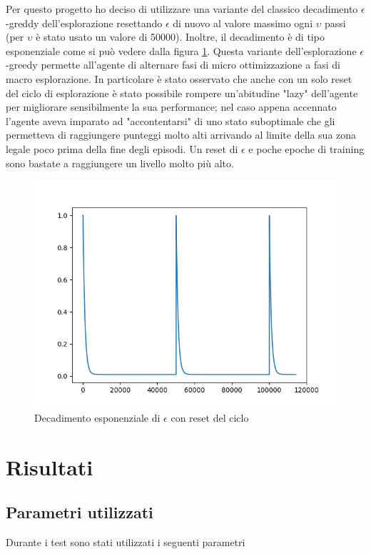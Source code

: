 \documentclass{article}
\begin{document}
		Per questo progetto ho deciso di utilizzare una variante del classico decadimento $\epsilon$-greddy dell'esplorazione resettando $\epsilon$ di nuovo al valore massimo ogni $\upsilon$ passi (per $\upsilon$ è stato usato un valore di 50000). Inoltre, il decadimento è di tipo esponenziale come si può vedere dalla figura \ref{fig:epsilon}. Questa variante dell'esplorazione $\epsilon$-greedy permette all'agente di alternare fasi di micro ottimizzazione a fasi di macro esplorazione. In particolare è stato osservato che anche con un solo reset del ciclo di esplorazione è stato possibile rompere un'abitudine "lazy" dell'agente per migliorare sensibilmente la sua performance; nel caso appena accennato l'agente aveva imparato ad "accontentarsi" di uno stato suboptimale che gli permetteva di raggiungere punteggi molto alti arrivando al limite della sua zona legale poco prima della fine degli episodi. Un reset di $\epsilon$ e poche epoche di training sono bastate a raggiungere un livello molto più alto.

		\begin{figure}[H]
			\centering
			\includegraphics[width=0.8\linewidth]{epsilon.png}
			\caption{Decadimento esponenziale di $\epsilon$ con reset del ciclo}
			\label{fig:epsilon}
		\end{figure}

	\section{Risultati}
	\subsection{Parametri utilizzati}
		Durante i test sono stati utilizzati i seguenti parametri \\
\end{document}
